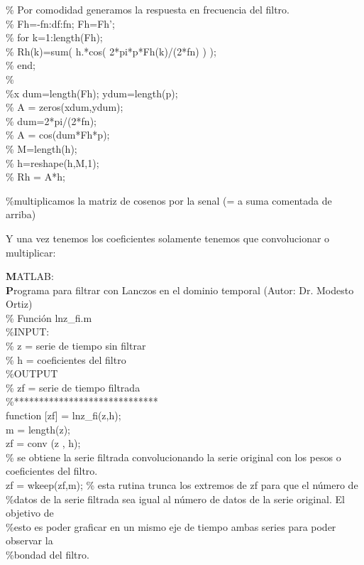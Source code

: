 \documentclass[
]{agujournal2019}
\begin{document}
\begin{framed}
\% Por comodidad generamos la respuesta en frecuencia del filtro.\\

\% Fh=-fn:df:fn; Fh=Fh';\\
\% for k=1:length(Fh);\\
\% Rh(k)=sum( h.*cos( 2*pi*p*Fh(k)/(2*fn) ) );\\
\% end;\\
\% \\
\%x dum=length(Fh); ydum=length(p);\\
\% A = zeros(xdum,ydum);\\
\% dum=2*pi/(2*fn);\\
\% A = cos(dum*Fh*p);\\

\% M=length(h);\\
\% h=reshape(h,M,1);\\

\% Rh = A*h;

\%multiplicamos la matriz de cosenos por la senal (= a suma comentada de arriba)\\

\end{framed}

Y una vez tenemos los coeficientes solamente tenemos que convolucionar o
multiplicar:

\begin{framed}
{\noindent \textbf MATLAB:}\\
{\textbf Programa para filtrar con Lanczos en el dominio temporal (Autor: Dr. Modesto Ortiz)}\\
\noindent \% Función lnz\_fi.m\\
\%INPUT:\\
\% z = serie de tiempo sin filtrar \\
\% h = coeficientes del filtro\\
\%OUTPUT\\
\% zf = serie de tiempo filtrada \\
\%*****************************\\
{\noindent}function [zf] = lnz\_fi(z,h);\\
m = length(z);\\
zf = conv (z , h); \\
\% se obtiene la serie filtrada convolucionando la serie original con los pesos o coeficientes del filtro.\\
zf = wkeep(zf,m); \% esta rutina trunca los extremos de zf para que el número de \\
\%datos de la serie filtrada sea igual al número de datos de la serie original. El objetivo de \\
\%esto es poder graficar en un mismo eje de tiempo ambas series para poder observar la \\
\%bondad del filtro.\\
\end{framed}
\end{document}
